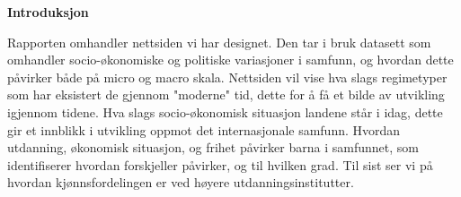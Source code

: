 \textbf{Introduksjon}

Rapporten omhandler nettsiden vi har designet. Den tar i bruk datasett som omhandler socio-økonomiske og politiske variasjoner i samfunn, og hvordan dette påvirker både på micro og macro skala. 
Nettsiden vil vise hva slags regimetyper som har eksistert de gjennom "moderne" tid, dette for å få et bilde av utvikling igjennom tidene. Hva slags socio-økonomisk situasjon landene står i idag, dette gir et innblikk i utvikling oppmot det internasjonale samfunn. Hvordan utdanning, økonomisk situasjon, og frihet påvirker barna i samfunnet, som identifiserer hvordan forskjeller påvirker, og til hvilken grad. Til sist ser vi på hvordan kjønnsfordelingen er ved høyere utdanningsinstitutter.